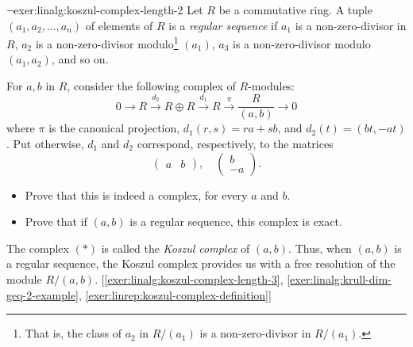 \begin{exer}{$\lnot$}{exer:linalg:koszul-complex-length-2}
  Let $R$ be a commutative ring. A tuple $(a_1, a_2, \dots, a_n)$ of
  elements of $R$ is a \emph{regular sequence} if $a_1$ is a
  non-zero-divisor in $R$, $a_2$ is a non-zero-divisor
  modulo\footnote{That is, the class of $a_2$ in $R/(a_1)$ is a
    non-zero-divisor in $R/(a_1)$.} $(a_1)$, $a_3$ is a
  non-zero-divisor modulo $(a_1, a_2)$, and so on.

  For $a, b$ in $R$, consider the following complex of $R$-modules:
  \[
    \tag{*} 0 \to R \xrightarrow{d_2} R \oplus R \xrightarrow{d_1} R
    \xrightarrow{\pi} \frac{R}{(a,b)} \to 0
  \]
  where $\pi$ is the canonical projection, $d_1(r,s) = ra + sb$, and
  $d_2(t) = (bt, -at)$. Put otherwise, $d_1$ and $d_2$ correspond,
  respectively, to the matrices
  \[
    \begin{pmatrix} a & b \end{pmatrix}, \quad
    \begin{pmatrix} b \\ -a \end{pmatrix}.
  \]
  \begin{itemize}
  \item Prove that this is indeed a complex, for every $a$ and $b$.
  \item Prove that if $(a,b)$ is a regular sequence, this complex is
    exact.
  \end{itemize}
  The complex $(*)$ is called the \emph{Koszul complex} of
  $(a,b)$. Thus, when $(a,b)$ is a regular sequence, the Koszul
  complex provides us with a free resolution of the module
  $R/(a,b)$. [\ref{exer:linalg:koszul-complex-length-3},
  \ref{exer:linalg:krull-dim-geq-2-example},
  \ref{exer:linrep:koszul-complex-definition}]
\end{exer}
